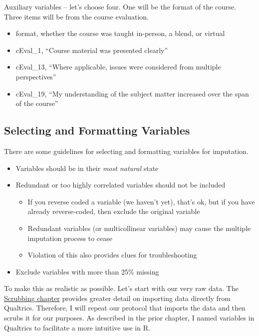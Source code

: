 \documentclass[
]{book}
\providecommand{\tightlist}{%
  \setlength{\itemsep}{0pt}\setlength{\parskip}{0pt}}
\begin{document}
Auxiliary variables -- let's choose four. One will be the format of the course. Three items will be from the course evaluation.

\begin{itemize}
\tightlist
\item
  format, whether the course was taught in-person, a blend, or virtual
\item
  cEval\_1, ``Course material was presented clearly''
\item
  cEval\_13, ``Where applicable, issues were considered from multiple perspectives''
\item
  cEval\_19, ``My understanding of the subject matter increased over the span of the course''
\end{itemize}

\hypertarget{selecting-and-formatting-variables}{%
\subsection{Selecting and Formatting Variables}\label{selecting-and-formatting-variables}}

There are some guidelines for selecting and formatting variables for imputation.

\begin{itemize}
\tightlist
\item
  Variables should be in their \emph{most natural} state
\item
  Redundant or too highly correlated variables should not be included

  \begin{itemize}
  \tightlist
  \item
    If you reverse coded a variable (we haven't yet), that's ok, but if you have already reverse-coded, then exclude the original variable
  \item
    Redundant variables (or multicollinear variables) may cause the multiple imputation process to cease
  \item
    Violation of this also provides clues for troubleshooting
  \end{itemize}
\item
  Exclude variables with more than 25\% missing
\end{itemize}

To make this as realistic as possible. Let's start with our very raw data. The \protect\hyperlink{scrub}{Scrubbing chapter} provides greater detail on importing data directly from Qualtrics. Therefore, I will repeat our protocol that imports the data and then scrubs it for our purposes. As described in the prior chapter, I named variables in Qualtrics to facilitate a more intuitive use in R.
\end{document}
